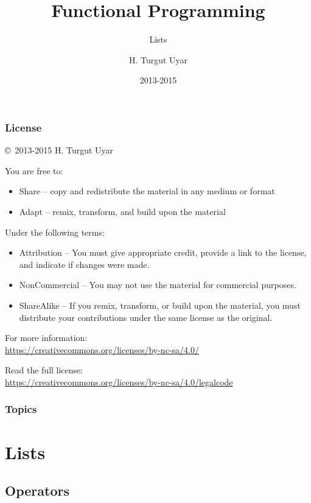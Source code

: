 \documentclass[dvipsnames]{beamer}
\title{Functional Programming}
\subtitle{Lists}
\author{H. Turgut Uyar}
\date{2013-2015}
\theoremstyle{plain}
\begin{document}
\begin{frame}
  \titlepage
\end{frame}

\begin{frame}
  \frametitle{License}

  \hfill
  \copyright~2013-2015 H. Turgut Uyar

  \vfill
  \begin{footnotesize}
    You are free to:
    \begin{itemize}
      \itemsep0em
      \item Share -- copy and redistribute the material in any medium or format
      \item Adapt -- remix, transform, and build upon the material
    \end{itemize}

    Under the following terms:
    \begin{itemize}
      \itemsep0em
      \item Attribution -- You must give appropriate credit, provide a link to
        the license, and indicate if changes were made.

      \item NonCommercial -- You may not use the material for commercial
        purposes.

      \item ShareAlike -- If you remix, transform, or build upon the material,
        you must distribute your contributions under the same license as the
        original.
    \end{itemize}

    For more information:\\
    \url{https://creativecommons.org/licenses/by-nc-sa/4.0/}

    \smallskip
    Read the full license:\\
    \url{https://creativecommons.org/licenses/by-nc-sa/4.0/legalcode}
  \end{footnotesize}
\end{frame}

\begin{frame}
  \frametitle{Topics}
  \tableofcontents
\end{frame}

\section{Lists}

\subsection{Operators}
\end{document}
